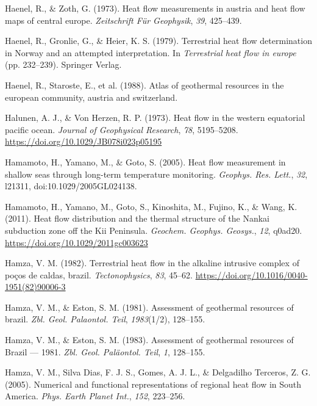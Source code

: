 \begin{CSLReferences}{1}{1}
\leavevmode{}%
Haenel, R., \& Zoth, G. (1973). Heat flow measurements in austria and heat flow maps of central europe. \emph{Zeitschrift Für Geophysik}, \emph{39}, 425--439.

\leavevmode{}%
Haenel, R., Gronlie, G., \& Heier, K. S. (1979). Terrestrial heat flow determination in {Norway} and an attempted interpretation. In \emph{Terrestrial heat flow in europe} (pp. 232--239). Springer Verlag.

\leavevmode{}%
Haenel, R., Staroste, E., et al. (1988). Atlas of geothermal resources in the european community, austria and switzerland.

\leavevmode{}%
Halunen, A. J., \& Von Herzen, R. P. (1973). Heat flow in the western equatorial pacific ocean. \emph{Journal of Geophysical Research}, \emph{78}, 5195--5208. \url{https://doi.org/10.1029/JB078i023p05195}

\leavevmode{}%
Hamamoto, H., Yamano, M., \& Goto, S. (2005). Heat flow measurement in shallow seas through long-term temperature monitoring. \emph{Geophys. Res. Lett.}, \emph{32}, l21311, doi:10.1029/2005GL024138.

\leavevmode{}%
Hamamoto, H., Yamano, M., Goto, S., Kinoshita, M., Fujino, K., \& Wang, K. (2011). Heat flow distribution and the thermal structure of the {Nankai} subduction zone off the {Kii Peninsula}. \emph{Geochem. Geophys. Geosys.}, \emph{12}, q0ad20. \url{https://doi.org/10.1029/2011gc003623}

\leavevmode{}%
Hamza, V. M. (1982). Terrestrial heat flow in the alkaline intrusive complex of poços de caldas, brazil. \emph{Tectonophysics}, \emph{83}, 45--62. \url{https://doi.org/10.1016/0040-1951(82)90006-3}

\leavevmode{}%
Hamza, V. M., \& Eston, S. M. (1981). Assessment of geothermal resources of brazil. \emph{Zbl. Geol. Palaontol. Teil}, \emph{1983}(1/2), 128--155.

\leavevmode{}%
Hamza, V. M., \& Eston, S. M. (1983). Assessment of geothermal resources of {Brazil} --- 1981. \emph{Zbl. Geol. Paläontol. Teil}, \emph{1}, 128--155.

\leavevmode{}%
Hamza, V. M., Silva Dias, F. J. S., Gomes, A. J. L., \& Delgadilho Terceros, Z. G. (2005). Numerical and functional representations of regional heat flow in {South America}. \emph{Phys. Earth Planet Int.}, \emph{152}, 223--256.


\end{CSLReferences}
